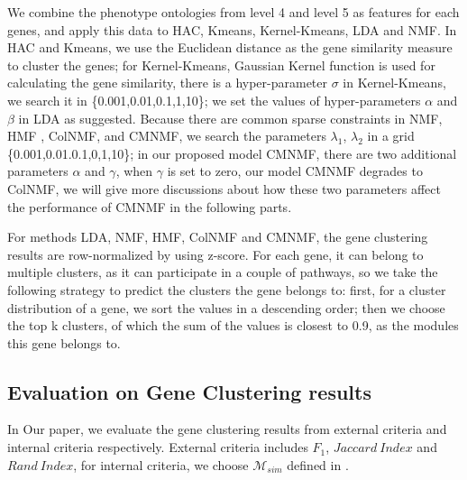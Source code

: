 \documentclass{bmcart}
\begin{document}
We combine the phenotype ontologies from level 4 and level 5 as features for each genes, and apply this data to HAC, Kmeans, Kernel-Kmeans, LDA and NMF. In HAC and Kmeans, we use the Euclidean distance as the gene similarity measure to cluster the genes; for Kernel-Kmeans, Gaussian Kernel function is used for calculating the gene similarity, there is a hyper-parameter $\sigma$ in Kernel-Kmeans, we search it in \{0.001,0.01,0.1,1,10\}; we set the values of hyper-parameters $\alpha$ and $\beta$ in LDA as \cite{Wei2006} suggested. Because there are common sparse constraints in NMF, HMF , ColNMF, and CMNMF, we search the parameters $\lambda_1$, $\lambda_2$ in a grid \{0.001,0.01.0.1,0,1,10\}; in our proposed model CMNMF, there are two additional parameters $\alpha$ and $\gamma$, when $\gamma$ is set to zero, our model CMNMF degrades to ColNMF, we will give more discussions about how these two parameters affect the performance of CMNMF in the following parts.

For methods LDA, NMF, HMF, ColNMF and CMNMF, the gene clustering results are row-normalized by using z-score. For each gene, it can belong to multiple clusters, as it can participate in a couple of pathways, so we take the following strategy to predict the clusters the gene belongs to: first, for a cluster distribution of a gene, we sort the values in a descending order; then we choose the top k clusters, of which the sum of the values is closest to 0.9, as the modules this gene belongs to.
\subsection*{\textbf{Evaluation on Gene Clustering results}}
In Our paper, we evaluate the gene clustering results from external criteria and internal criteria respectively. External criteria includes $F_1$, $Jaccard\ Index$ and $Rand\ Index$, for internal criteria, we choose $\mathcal{M}_{sim}$ defined in \cite{Bordino2010}.
\end{document}
